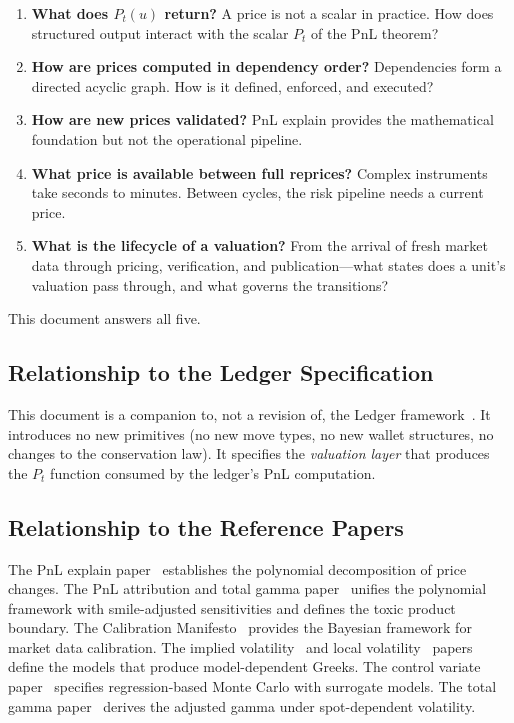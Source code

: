 \documentclass[11pt,a4paper]{article}
\begin{document}
\begin{enumerate}
\item \textbf{What does $P_t(u)$ return?}  A price is not a scalar in practice.  How does structured output interact with the scalar $P_t$ of the PnL theorem?

\item \textbf{How are prices computed in dependency order?}  Dependencies form a directed acyclic graph.  How is it defined, enforced, and executed?

\item \textbf{How are new prices validated?}  PnL explain provides the mathematical foundation but not the operational pipeline.

\item \textbf{What price is available between full reprices?}  Complex instruments take seconds to minutes.  Between cycles, the risk pipeline needs a current price.

\item \textbf{What is the lifecycle of a valuation?}  From the arrival of fresh market data through pricing, verification, and publication---what states does a unit's valuation pass through, and what governs the transitions?
\end{enumerate}

This document answers all five.

\subsection{Relationship to the Ledger Specification}

This document is a companion to, not a revision of, the Ledger framework~\cite{ledger}.  It introduces no new primitives (no new move types, no new wallet structures, no changes to the conservation law).  It specifies the \emph{valuation layer} that produces the $P_t$ function consumed by the ledger's PnL computation.

\subsection{Relationship to the Reference Papers}

The PnL explain paper~\cite{pnl_explain} establishes the polynomial decomposition of price changes.  The PnL attribution and total gamma paper~\cite{pnl_total_gamma} unifies the polynomial framework with smile-adjusted sensitivities and defines the toxic product boundary.  The Calibration Manifesto~\cite{calibration_manifesto} provides the Bayesian framework for market data calibration.  The implied volatility~\cite{implied_vol} and local volatility~\cite{implied_local_vol,loc_vol} papers define the models that produce model-dependent Greeks.  The control variate paper~\cite{control_variate} specifies regression-based Monte Carlo with surrogate models.  The total gamma paper~\cite{total_gamma} derives the adjusted gamma under spot-dependent volatility.
\end{document}
